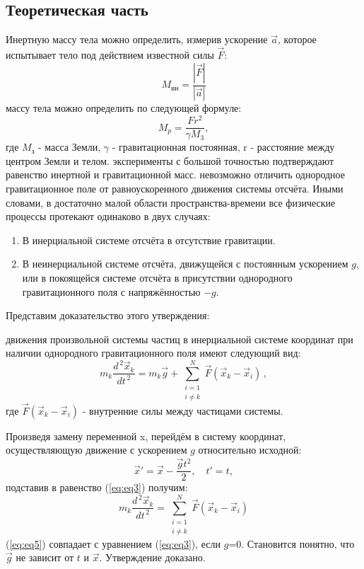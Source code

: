 \subsection{Теоретическая часть}
Инертную массу тела можно определить, измерив ускорение $\vec{a}$, которое испытывает тело под действием известной силы $\vec{F}$:
\begin{equation}
    M_{ин}=\frac{|\vec{F}|}{|\vec{a}|}
\end{equation}
  массу тела можно определить по следующей формуле:
\begin{equation}
 M_{p} = \frac{F r^{2}}{\gamma M_{3}},
\end{equation}
где $M_{з}$ - масса Земли, $\gamma$ - гравитационная постоянная, r - расстояние между центром Земли и телом.
 эксперименты с большой точностью подтверждают равенство инертной и гравитационной масс. 
 невозможно отличить однородное гравитационное поле от равноускоренного движения системы отсчёта. Иными словами, в достаточно малой области пространства-времени все физические процессы протекают одинаково в двух случаях:
\begin{enumerate}
    \item  В инерциальной системе отсчёта в отсутствие гравитации.
    \item  В неинерциальной системе отсчёта, движущейся с постоянным ускорением $g$, или в покоящейся системе отсчёта в присутствии однородного гравитационного поля с напряжённостью $-g$.
\end{enumerate}
\par Представим доказательство этого утверждения:



 движения произвольной системы частиц в инерциальной системе координат при наличии однородного гравитационного поля имеют следующий вид:
\begin{equation}
\label{eq3}
m_k \frac{d^{\, 2}\vec{x}_k}{dt^{\, 2}} = m_k\vec{g} + \sum_{\substack{i=1 \\ i\neq k}}^{N}  \vec{F}(\vec{x}_k - \vec{x}_i)\,,
\end{equation}
где $\vec{F}(\vec{x}_k - \vec{x}_i)$ - внутренние силы между частицами системы.
\par Произведя замену переменной x, перейдём в систему координат, осуществляющую движение с ускорением $g$ относительно исходной:
\begin{equation}
\label{eq4}
\vec{x}' = \vec{x} - \frac{\vec{g}t^2}{2}, \quad t' = t,
\end{equation}
подставив в равенство (\ref{eq:eq3}) получим:
\begin{equation}
\label{eq5}
m_k \frac{d^{\, 2}\vec{x}_k}{dt^{\, 2}} =  \sum_{\substack{i=1 \\ i\neq k}}^{N}  \vec{F}(\vec{x}_k - \vec{x}_i)
\end{equation}
 (\ref{eq:eq5}) совпадает с уравнением (\ref{eq:eq3}), если $g$=0. Становится понятно, что $\vec{g}$ не зависит от $t$ и $\vec{x}$. Утверждение доказано.

